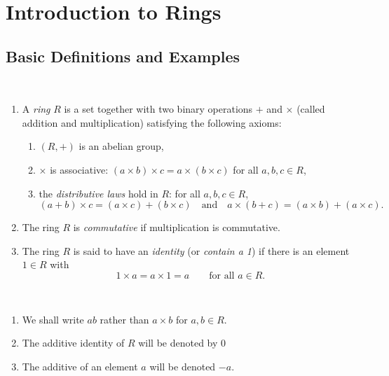 \documentclass[../main]{subfiles}
\begin{document}
\section{Introduction to Rings}


\subsection{Basic Definitions and Examples}


\begin{dfn}
 ~\begin{enumerate}
   \item A \textit{ring} $R$ is a set together with two binary operations $+$ and $\times$ (called addition and multiplication) satisfying the following axioms:
   
   \begin{enumerate}
    \item $(R,+)$ is an abelian group,
    
    \item $\times$ is associative: $(a \times b) \times c = a \times (b \times c)$ for all $a,b,c \in R$,
    
    \item the \textit{distributive laws} hold in $R$: for all $a,b,c \in R$,
    \[ (a+b)\times c = (a\times c)+(b\times c) \quad \text{and} \quad a\times (b+c) = (a\times b)+(a\times c). \]
   \end{enumerate}
   
   \item The ring $R$ is \textit{commutative} if multiplication is commutative.
   
   \item The ring $R$ is said to have an \textit{identity} (or \textit{contain a 1}) if there is an element $1\in R$ with 
   \[ 1\times a = a\times 1 = a \qquad \text{for all } a\in R. \]
  \end{enumerate}
\end{dfn}


\begin{nt}
 ~\begin{enumerate}
  \item We shall write $ab$ rather than $a\times b$ for $a,b\in R$. 
  
  \item The additive identity of $R$ will be denoted by 0
  
  \item The additive of an element $a$ will be denoted $-a$.
 \end{enumerate}
\end{nt}
\end{document}
